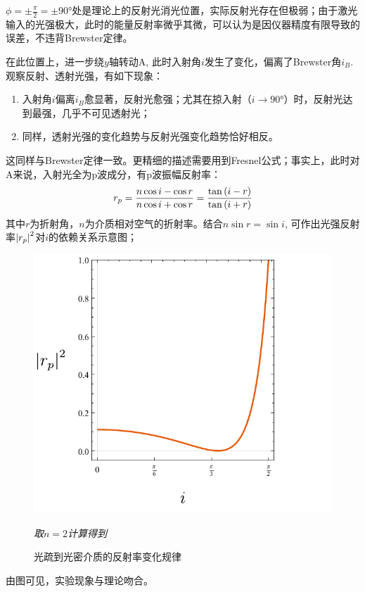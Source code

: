 \documentclass[a4paper,10pt]{article}
\begin{document}
	$\phi = \pm\frac{\pi}{2} = \pm\ang{90}$处是理论上的反射光消光位置，实际反射光存在但极弱；由于激光输入的光强极大，此时的能量反射率微乎其微，可以认为是因仪器精度有限导致的误差，不违背Brewster定律。
	
	在此位置上，进一步绕$y$轴转动A, 此时入射角$i$发生了变化，偏离了Brewster角$i_B$. 观察反射、透射光强，有如下现象：
	\begin{enumerate}[noitemsep]
	\item 入射角$i$偏离$i_B$愈显著，反射光愈强；尤其在掠入射（$i\to\ang{90}$）时，反射光达到最强，几乎不可见透射光；
	\item 同样，透射光强的变化趋势与反射光强变化趋势恰好相反。
	\end{enumerate}
	
	这同样与Brewster定律一致。更精细的描述需要用到Fresnel公式；事实上，此时对A来说，入射光全为p波成分，有p波振幅反射率：
	\begin{equation}
		r_p = \frac{n\cos i - \cos r}
			{n\cos i + \cos r}
		= \frac{\tan\pqty{i - r}}
			{\tan\pqty{i + r}}
	\end{equation}
	其中$r$为折射角，$n$为介质相对空气的折射率。结合$n\sin r = \sin i$, 可作出光强反射率$\abs{r_p}^2$对$i$的依赖关系示意图；
	\begin{figure}[!h]
	\centering
	\includegraphics[width=.7\linewidth]{rpgraph}
	\caption{光疏到光密介质的反射率变化规律}
	\small\itshape 取$n=2$计算得到
	\end{figure}
	由图可见，实验现象与理论吻合。
\end{document}

